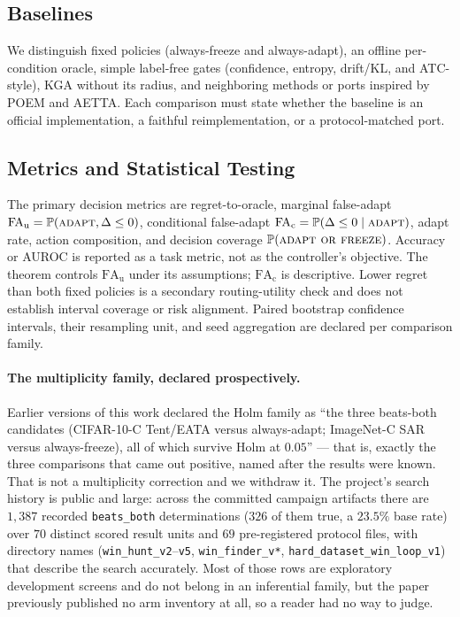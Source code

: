 \subsection{Baselines}
We distinguish fixed policies (always-freeze and always-adapt), an offline per-condition oracle, simple label-free gates (confidence, entropy, drift/KL, and ATC-style), KGA without its radius, and neighboring methods or ports inspired by POEM and AETTA. Each comparison must state whether the baseline is an official implementation, a faithful reimplementation, or a protocol-matched port.

\subsection{Metrics and Statistical Testing}
The primary decision metrics are regret-to-oracle, marginal false-adapt $\mathrm{FA}_{\mathrm u}=\Pr(\textsc{adapt},\Delta\le0)$, conditional false-adapt $\mathrm{FA}_{\mathrm c}=\Pr(\Delta\le0\mid\textsc{adapt})$, adapt rate, action composition, and decision coverage $\Pr(\textsc{adapt or freeze})$. Accuracy or AUROC is reported as a task metric, not as the controller's objective. The theorem controls $\mathrm{FA}_{\mathrm u}$ under its assumptions; $\mathrm{FA}_{\mathrm c}$ is descriptive. Lower regret than both fixed policies is a secondary routing-utility check and does not establish interval coverage or risk alignment. Paired bootstrap confidence intervals, their resampling unit, and seed aggregation are declared per comparison family.

\paragraph{The multiplicity family, declared prospectively.}\label{par:multiplicity}
Earlier versions of this work declared the Holm family as ``the three beats-both candidates
(CIFAR-10-C Tent/EATA versus always-adapt; ImageNet-C SAR versus always-freeze), all of which
survive Holm at $0.05$'' --- that is, exactly the three comparisons that came out positive, named
after the results were known. That is not a multiplicity correction and we withdraw it. The
project's search history is public and large: across the committed campaign artifacts there are
$1{,}387$ recorded \texttt{beats\_both} determinations ($326$ of them true, a $23.5\%$ base rate)
over $70$ distinct scored result units and $69$ pre-registered protocol files, with directory names
(\texttt{win\_hunt\_v2}--\texttt{v5}, \texttt{win\_finder\_v*}, \texttt{hard\_dataset\_win\_loop\_v1})
that describe the search accurately. Most of those rows are exploratory development screens and do
not belong in an inferential family, but the paper previously published no arm inventory at all, so
a reader had no way to judge.

